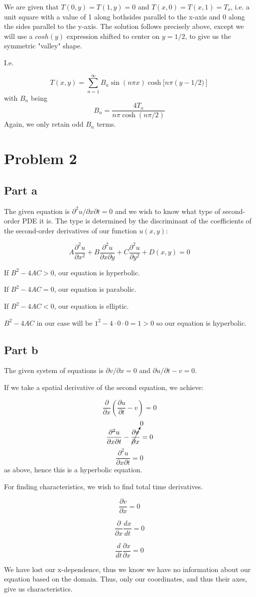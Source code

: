 \documentclass[11pt]{article} %
\begin{document}
We are given that $T(0, y) = T(1, y)  = 0$ and $T(x,0) = T(x,1) = T_o$, i.e. a unit square with a value of 1 along bothsides parallel to the x-axis and $0$ along the sides parallel to the y-axis. The solution follows precisely above, except we will use a $cosh(y)$ expression shifted to center on $y = 1/2$, to give us the symmetric "valley" shape.

I.e.

\[ T(x, y) = \sum_{n=1}^{\infty} B_n \sin(n \pi x)  \cosh[n \pi \left(y - 1/2)\right] \] 
with $B_n$ being \[ B_n = \frac{4 T_o}{n \pi  \cosh(n \pi / 2)}\]
Again, we only retain odd $B_n$ terms.

\section{Problem 2}

\subsection{Part a}

The given equation is $\partial^2 u/\partial x \partial t = 0$ and we wish to know what type of second-order PDE it is. The type is determined by the discriminant of the coefficients of the second-order derivatives of our function $u(x,y)$: 

\[ A \frac{\partial^2 u}{ \partial x^2} + B \frac{\partial^2 u}{ \partial x \partial y} + C \frac{\partial^2 u}{ \partial y^2} + D(x,y) = 0 \]

If $B^2 - 4 A C > 0$, our equation is hyperbolic.

If $B^2 - 4 A C = 0$, our equation is parabolic.

If $B^2 - 4 A C < 0$, our equation is elliptic.

$B^2 - 4 A C $ in our case will be $1^2 - 4 \cdot 0 \cdot 0  = 1 > 0 $ so our equation is hyperbolic.

\subsection{Part b}

The given system of equations is ${\partial v}/{\partial x} = 0$ and ${\partial u}/{\partial t} - v= 0$.

If we take a spatial derivative of the second equation, we achieve:

\[ \frac {\partial} {\partial x} \left( \frac {\partial u}{\partial t} - v \right) = 0\]
\[ \frac {\partial^2 u}{\partial x \partial t} - \cancelto{0}{\frac {\partial v}{\partial x}} = 0\]
\[  \frac {\partial^2 u}{\partial x \partial t} = 0\]
as above, hence this is a hyperbolic equation.

For finding characteristics, we wish to find total time derivatives. 

\[ \frac {\partial v}{\partial x} = 0 \]

\[\frac {\partial}{\partial x} \frac {d x}{dt}= 0 \]

\[\frac {d}{dt} \frac {\partial x}{\partial x} = 0 \]

We have lost our x-dependence, thus we know we have no information about our equation based on the domain. Thus, only our coordinates, and thus their axes, give us characteristics.
\end{document}
